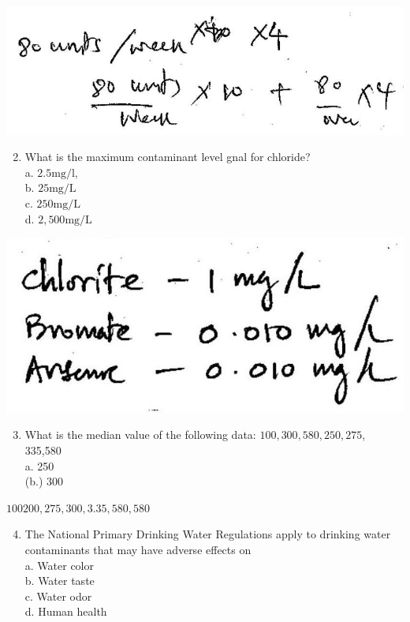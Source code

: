 \documentclass[10pt]{article}
\begin{document}
\includegraphics[max width=\textwidth]{2022_11_11_ca6a6c1a0324ee23e523g-43(1)}

\begin{enumerate}
  \setcounter{enumi}{1}
  \item What is the maximum contaminant level gnal for chloride?\\
a. $2.5 \mathrm{mg} / \mathrm{l}$,\\
b. $25 \mathrm{mg} / \mathrm{L}$\\
c. $250 \mathrm{mg} / \mathrm{L}$\\
d. $2,500 \mathrm{mg} / \mathrm{L}$
\end{enumerate}

\includegraphics[max width=\textwidth]{2022_11_11_ca6a6c1a0324ee23e523g-43(2)}

\begin{enumerate}
  \setcounter{enumi}{2}
  \item What is the median value of the following data: $100,300,580,250,275$, 335,580\\
a. 250\\
(b.) 300
\end{enumerate}

$100200,275,300,3.35,580,580$

\begin{enumerate}
  \setcounter{enumi}{3}
  \item The National Primary Drinking Water Regulations apply to drinking water contaminants that may have adverse effects on\\
a. Water color\\
b. Water taste\\
c. Water odor\\
d. Human health
\end{enumerate}
\end{document}
